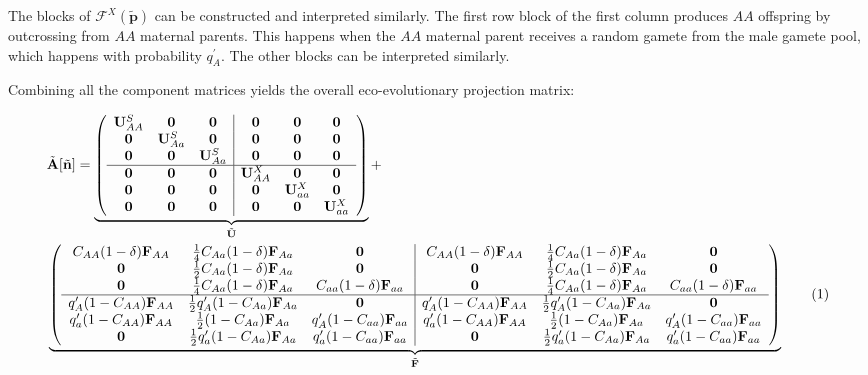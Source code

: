 \documentclass[11pt]{article}
\newcommand\numberthis{\addtocounter{equation}{1}\tag{\theequation}}
\def\mbf#1{\mathbf{#1}}
\def\mcal#1{\mathcal{#1}}
\begin{document}
The blocks of $\mcal{F}^X(\tilde{\mbf{p}})$ can be constructed and interpreted similarly. The first row block of the first column produces $AA$ offspring by outcrossing from $AA$ maternal parents. This happens when the $AA$ maternal parent receives a random gamete from the male gamete pool, which happens with probability $q^{\prime}_{A}$. The other blocks can be interpreted similarly.

Combining all the component matrices yields the overall eco-evolutionary projection matrix:

\begin{align*}
	&\tilde{\mbf{A}}[\tilde{\mbf{n}}] = 
		 \underbrace{\left(
			\begin{array}{ccc|ccc}
				\mbf{U}^S_{AA} & \mbf{0} & \mbf{0} & \mbf{0} & \mbf{0} & \mbf{0} \\ 
				\mbf{0} & \mbf{U}^S_{Aa} & \mbf{0} & \mbf{0} & \mbf{0} & \mbf{0} \\
				\mbf{0} & \mbf{0} & \mbf{U}^S_{Aa} & \mbf{0} & \mbf{0} & \mbf{0} \\ \hline
				\mbf{0} & \mbf{0} & \mbf{0} & \mbf{U}^X_{AA} & \mbf{0} & \mbf{0} \\
				\mbf{0} & \mbf{0} & \mbf{0} & \mbf{0} & \mbf{U}^X_{aa} & \mbf{0}\\
				\mbf{0} & \mbf{0} & \mbf{0} & \mbf{0} & \mbf{0} & \mbf{U}^X_{aa}
			\end{array} \right)}_{\tilde{\mbf{U}}} + \\ 
	&\underbrace{\left(
			\begin{array}{ccc|ccc}
				C_{AA} (1 - \delta) \mbf{F}_{AA} & \frac{1}{4} C_{Aa} (1 - \delta) \mbf{F}_{Aa} & \mbf{0} & C_{AA} (1 - \delta) \mbf{F}_{AA} & \frac{1}{4} C_{Aa} (1 - \delta) \mbf{F}_{Aa} & \mbf{0} \\ 
				\mbf{0} & \frac{1}{2} C_{Aa} (1 - \delta) \mbf{F}_{Aa} & \mbf{0} & \mbf{0} & \frac{1}{2} C_{Aa} (1 - \delta) \mbf{F}_{Aa} & \mbf{0}  \\
				\mbf{0} & \frac{1}{4} C_{Aa} (1 - \delta) \mbf{F}_{Aa} & C_{aa} (1 - \delta) \mbf{F}_{aa} & \mbf{0} & \frac{1}{4} C_{Aa} (1 - \delta) \mbf{F}_{Aa} & C_{aa} (1 - \delta) \mbf{F}_{aa} \\ \hline
				q^{\prime}_{A} (1 - C_{AA})\mbf{F}_{AA} & \frac{1}{2} q^{\prime}_{A} (1 - C_{Aa})\mbf{F}_{Aa}  & \mbf{0} & q^{\prime}_{A} (1 - C_{AA}) \mbf{F}_{AA}& \frac{1}{2} q^{\prime}_{A} (1 - C_{Aa}) \mbf{F}_{Aa} & \mbf{0} \\
				q^{\prime}_{a} (1 - C_{AA}) \mbf{F}_{AA} & \frac{1}{2} (1 - C_{Aa})\mbf{F}_{Aa}  & q^{\prime}_{A} (1 - C_{aa})\mbf{F}_{aa}  & q^{\prime}_{a} (1 - C_{AA}) \mbf{F}_{AA} & \frac{1}{2}(1 - C_{Aa}) \mbf{F}_{Aa}  & q^{\prime}_{A} (1 - C_{aa})\mbf{F}_{aa}  \\
				\mbf{0} & \frac{1}{2} q^{\prime}_{a} (1 - C_{Aa})\mbf{F}_{Aa} & q^{\prime}_{a} (1 - C_{aa}) \mbf{F}_{aa} & \mbf{0} & \frac{1}{2} q^{\prime}_{a} (1 - C_{Aa})\mbf{F}_{Aa} & q^{\prime}_{a} (1 - C_{aa})\mbf{F}_{aa} 
			\end{array} \right)}_{\tilde{\mbf{F}}} \numberthis
\end{align*}
\end{document}

